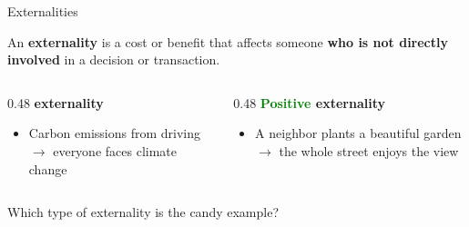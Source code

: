 \documentclass[9pt,english,aspectratio=169]{beamer}
\begin{document}
\begin{frame}{Externalities}

  \begin{definitionbox}[Externality]
    An \textbf{externality} is a cost or benefit that affects someone \textbf{who is not directly involved} in a decision or transaction.
  \end{definitionbox}

  \vspace{0.5em}
  \begin{columns}[T]
    \begin{column}{0.48\textwidth}
      \textbf{ externality}
      \begin{itemize}
        \item Carbon emissions from driving $\rightarrow$ everyone faces climate change
      \end{itemize}
    \end{column}
    \begin{column}{0.48\textwidth}
      \textbf{\textcolor{green}{Positive} externality}
      \begin{itemize}
        \item A neighbor plants a beautiful garden $\rightarrow$ the whole street enjoys the view
      \end{itemize}
    \end{column}
  \end{columns}

  \vspace{0.5em} \pause
  \begin{questionbox}
    Which type of externality is the candy example?
  \end{questionbox}

\end{frame}
\end{document}

